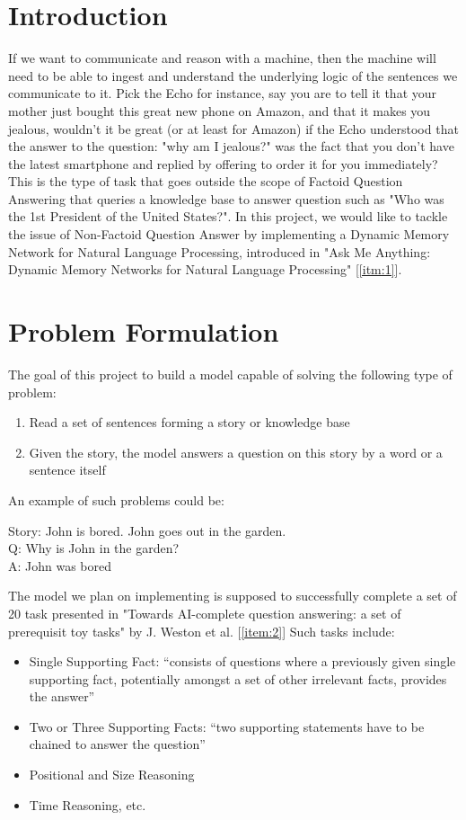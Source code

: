 \documentclass[submit]{harvardml}
\begin{document}
\section*{Introduction}

If we want to communicate and reason with a machine, then the machine will need to be able to ingest and understand the underlying logic of the sentences we communicate to it. Pick the Echo for instance, say you are to tell it that your mother just bought this great new phone on Amazon, and that it makes you jealous, wouldn't it be great (or at least for Amazon) if the Echo understood that the answer to the question: "why am I jealous?" was the fact that you don't have the latest smartphone and replied by offering to order it for you immediately? This is the type of task that goes outside the scope of Factoid Question Answering that queries a knowledge base to answer question such as "Who was the 1st President of the United States?". In this project, we would like to tackle the issue of Non-Factoid Question Answer by implementing a Dynamic Memory Network for Natural Language Processing, introduced in "Ask Me Anything: Dynamic Memory Networks for Natural Language Processing" [\ref{itm:1}].

\section{Problem Formulation}

The goal of this project to build a model capable of solving the following type of problem:

\begin{enumerate}
\item Read a set of sentences forming a story or knowledge base
\item Given the story, the model answers a question on this story by a word or a sentence itself
\end{enumerate}
An example of such problems could be:

\begin{framed}
\begin{center}
Story: John is bored. John goes out in the garden.\\
Q: Why is John in the garden?\\
A: John was bored
\end{center}
\end{framed}

The model we plan on implementing is supposed to successfully complete a set of 20 task presented in "Towards AI-complete question answering: a set of prerequisit toy tasks" by J. Weston et al. [\ref{item:2}] Such tasks include:
\begin{itemize}
\item Single Supporting Fact: ``consists of questions where a previously given single supporting fact, potentially amongst a set of other irrelevant facts, provides the answer''
\item Two or Three Supporting Facts: ``two supporting statements have to be chained to answer the question''
\item Positional and Size Reasoning
\item Time Reasoning, etc.
\end{itemize}
\end{document}
